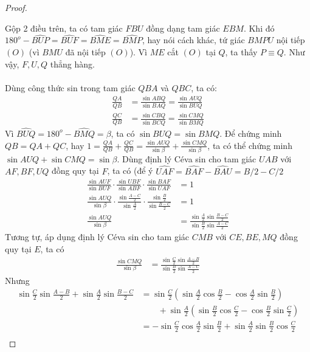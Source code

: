 \documentclass{treatise}
\begin{document}
\begin{proof}
\begin{enumerate}
\end{enumerate}
Gộp 2 điều trên, ta có tam giác $FBU$ đồng dạng tam giác $EBM$. Khi đó $180^o - \hat{BUP} = \hat{BUF} = \hat{BME} = \hat{BMP}$, hay nói cách khác, tứ giác $BMPU$ nội tiếp $(O)$ (vì $BMU$ đã nội tiếp $(O)$). Vì $ME$ cắt $(O)$ tại $Q$, ta thấy $P \equiv Q$. Như vậy, $F, U, Q$ thẳng hàng.
\\
\\
Dùng công thức sin trong tam giác $QBA$ và $QBC$, ta có:
\begin{align*}
\frac{QA}{QB} & = \frac{\sin ABQ}{\sin BAQ} = \frac{\sin AUQ}{\sin BUQ} \\
\frac{QC}{QB} & = \frac{\sin CBQ}{\sin BCQ} = \frac{\sin CMQ}{\sin BMQ}
\end{align*}
Vì $\hat{BUQ} = 180^o - \hat{BMQ} = \beta$, ta có $\sin BUQ = \sin BMQ$. Để chứng minh $QB = QA + QC$, hay $1 = \frac{QA}{QB} + \frac{QC}{QB} = \frac{\sin AUQ}{\sin \beta} + \frac{\sin CMQ}{\sin \beta}$, ta có thể chứng minh $\sin AUQ + \sin CMQ = \sin \beta$. Dùng định lý Céva sin cho tam giác $UAB$ với $AF, BF, UQ$ đồng quy tại $F$, ta có (để ý $\hat{UAF} = \hat{BAF} - \hat{BAU} = B/2 - C/2$
\begin{align*}
\frac{\sin AUF}{\sin BUF} \cdot \frac{\sin UBF}{\sin ABF} \cdot \frac{\sin BAF}{\sin UAF} & = 1
\\
\frac{\sin AUQ}{\sin \beta} \cdot \frac{\sin \frac{A-C}{2}}{\sin \frac{A}{2}} \cdot \frac{\sin \frac{B}{2}}{\sin \frac{B - C}{2}} & = 1
\\
\frac{\sin AUQ}{\sin \beta} & = \frac{\sin \frac{A}{2} \sin \frac{B - C}{2}}{\sin \frac{B}{2} \sin \frac{A-C}{2}}
\end{align*}
Tương tự, áp dụng định lý Céva sin cho tam giác $CMB$ với $CE, BE, MQ$ đồng quy tại $E$, ta có
\begin{align*}
\frac{\sin CMQ}{\sin \beta} & = \frac{\sin \frac{C}{2} \sin \frac{A - B}{2}}{\sin \frac{B}{2} \sin \frac{A-C}{2}}
\end{align*}
Nhưng
\begin{align*}
\sin \frac{C}{2} \sin \frac{A - B}{2} + \sin \frac{A}{2} \sin \frac{B - C}{2} & = \sin \frac{C}{2} \left( \sin \frac{A}{2} \cos \frac{B}{2} - \cos \frac{A}{2} \sin \frac{B}{2} \right)
\\
& \qquad + \sin \frac{A}{2} \left( \sin \frac{B}{2} \cos \frac{C}{2} - \cos \frac{B}{2} \sin \frac{C}{2} \right)
\\
& = - \sin \frac{C}{2} \cos \frac{A}{2} \sin \frac{B}{2} + \sin \frac{A}{2} \sin \frac{B}{2} \cos \frac{C}{2}
\\

\end{align*}
\end{proof}
\end{document}
